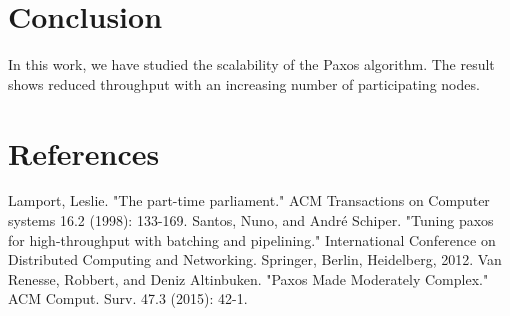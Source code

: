 \documentclass[conference]{IEEEtran}
\begin{document}
\section{Conclusion}
In this work, we have studied the scalability of the Paxos algorithm. The result shows reduced throughput with an increasing number of participating nodes. 


\section*{References}
%
%

\begin{thebibliography}{00}
 Lamport, Leslie. "The part-time parliament." ACM Transactions on Computer systems 16.2 (1998): 133-169.
 Santos, Nuno, and André Schiper. "Tuning paxos for high-throughput with batching and pipelining." International Conference on Distributed Computing and Networking. Springer, Berlin, Heidelberg, 2012.
Van Renesse, Robbert, and Deniz Altinbuken. "Paxos Made Moderately Complex." ACM Comput. Surv. 47.3 (2015): 42-1.
\end{thebibliography}
\end{document}
